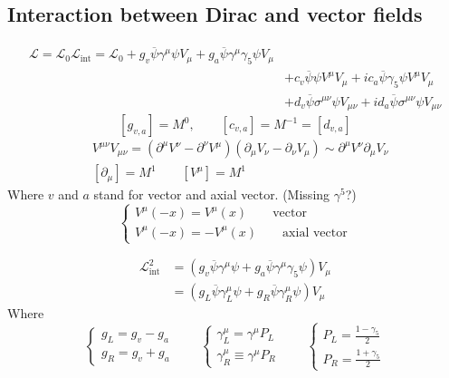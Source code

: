 \subsection{Interaction between Dirac and vector fields}
\begin{align*} \mathcal{L}  = \mathcal{L} _0 \mathcal{L} _\text{int} = \mathcal{L} _0 + g_v\overline{\psi}\gamma^\mu\psi V_\mu + g_a\overline{\psi}\gamma^\mu\gamma_5\psi V_\mu \\
 &+ c_v \overline{\psi}\psi V^\mu V_\mu + ic_a\overline{\psi}\gamma_5\psi V^\mu V_\mu \\
&+ d_v \overline{\psi}\sigma^{\mu\nu}\psi V_{\mu\nu} + id_a\overline{\psi}\sigma^{\mu\nu}\psi V_{\mu\nu} \end{align*}
\[ [g_{v,a}] = M^0, \qquad [c_{v,a}] = M^{-1} = [d_{v,a}] \]
\begin{align*}
&V^{\mu\nu}V_{\mu\nu} = \left(\partial^\mu V^\nu - \partial^\nu V^\mu\right)\left(\partial_\mu V_\nu - \partial_\nu V_\mu\right) \sim \partial^\mu V^\nu\partial_\mu V_\nu \\
&[\partial_\mu] = M^1 \qquad [V^\mu] = M^1
\end{align*}
Where $v$ and $a$ stand for vector and axial vector. (Missing $\gamma^5$?)
\[ \begin{cases}
V^\mu(-x) = V^\mu(x) \qquad \text{vector} \\
V^\mu(-x) = -V^\mu(x) \qquad \text{axial vector}
\end{cases} \]

\begin{align*}
\mathcal{L} ^2_\text{int} &= \left(g_v\overline{\psi}\gamma^\mu\psi + g_a\overline{\psi}\gamma^\mu\gamma_5\psi\right)V_\mu \\
&= \left(g_L\overline{\psi}\gamma_L^\mu\psi + g_R\overline{\psi}\gamma^\mu_R\psi\right)V_\mu
\end{align*}
Where
\[ \begin{cases}
g_L = g_v-g_a \\ g_R = g_v + g_a
\end{cases} \qquad \begin{cases}
\gamma^\mu_L = \gamma^\mu P_L\\ \gamma^\mu_R \equiv \gamma^\mu P_R
\end{cases} \qquad \begin{cases}
P_L = \frac{1-\gamma_5}{2} \\ P_R = \frac{1+\gamma_5}{2}
\end{cases}\]

